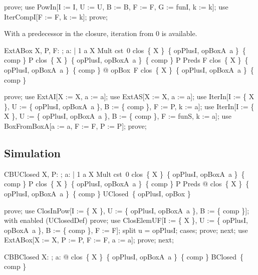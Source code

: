 \documentclass{article}
\begin{document}
\begin{zproof}
prove;
use PowIn[I := I, U := U, B := B, F := F, G := funI, k := k];
use IterCompI[F := F, k := k];
prove;
\end{zproof}

With a predecessor in the closure, iteration from $0$ is available.

\begin{theorem}{ExtABox}
  \forall X, P, F: \nat \fun \nat; a: \nat | 1 \leq a \land X \in Mult \land cst~0 \in clos~\{ X \}~\{ opPlusI, opBoxA~a \}~\{ comp \} \land P \in clos~\{ X \}~\{ opPlusI, opBoxA~a \}~\{ comp \}
      \land P \in Preds \land F \in clos~\{ X \}~\{ opPlusI, opBoxA~a \}~\{ comp \} @ opBox~F \in clos~\{ X \}~\{ opPlusI, opBoxA~a \}~\{ comp \}
\end{theorem}

\begin{zproof}
prove;
use ExtAI[X := X, a := a];
use ExtAS[X := X, a := a];
use IterIn[I := \{ X \}, U := \{ opPlusI, opBoxA~a \}, B := \{ comp \}, F := P, k := a];
use IterIn[I := \{ X \}, U := \{ opPlusI, opBoxA~a \}, B := \{ comp \}, F := funS, k := a];
use BoxFromBoxA[a := a, F := F, P := P];
prove;
\end{zproof}

\subsection{Simulation}

\begin{theorem}{CBUClosed}
  \forall X, P: \nat \fun \nat; a: \nat | 1 \leq a \land X \in Mult \land cst~0 \in clos~\{ X \}~\{ opPlusI, opBoxA~a \}~\{ comp \} \land P \in clos~\{ X \}~\{ opPlusI, opBoxA~a \}~\{ comp \} \land P \in Preds @
    clos~\{ X \}~\{ opPlusI, opBoxA~a \}~\{ comp \} \in UClosed~\{ opPlusI, opBox \}
\end{theorem}

\begin{zproof}
prove;
use ClosInPow[I := \{ X \}, U := \{ opPlusI, opBoxA~a \}, B := \{ comp \}];
with enabled (UClosedDef) prove;
use ClosElemUF[I := \{ X \}, U := \{ opPlusI, opBoxA~a \}, B := \{ comp \}, F := F];
split u = opPlusI;
cases;
prove;
next;
use ExtABox[X := X, P := P, F := F, a := a];
prove;
next;
\end{zproof}

\begin{theorem}{CBBClosed}
  \forall X: \nat \fun \nat; a: \nat @ clos~\{ X \}~\{ opPlusI, opBoxA~a \}~\{ comp \} \in BClosed~\{ comp \}
\end{theorem}
\end{document}
